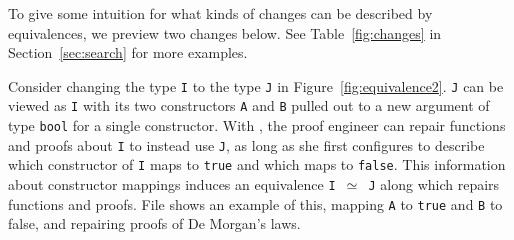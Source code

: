 %

To give some intuition for what kinds of changes can be described by equivalences, we preview two changes below.
See Table~\ref{fig:changes} in Section~\ref{sec:search} for more examples.

Consider changing the type \lstinline{I} to the type \lstinline{J} 
in Figure~\ref{fig:equivalence2}.
\lstinline{J} can be viewed as \lstinline{I} with its two constructors \lstinline{A} and \lstinline{B} pulled out to a
new argument of type \lstinline{bool} for a single constructor.
With \toolname, the proof engineer can repair functions and proofs about \lstinline{I} to instead use \lstinline{J},
as long as she first configures \toolname to describe which constructor 
of \lstinline{I} maps to \lstinline{true} and which maps to \lstinline{false}.
This information about constructor mappings induces an equivalence \lstinline{I }$\simeq$\lstinline{ J}
along which \toolname repairs functions and proofs.
File  shows an example of this, mapping \lstinline{A} to \lstinline{true} and \lstinline{B} to false,
and repairing proofs of De Morgan's laws. %
%

%

